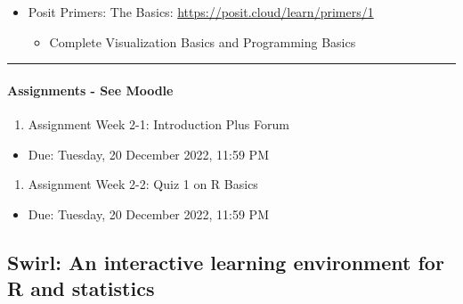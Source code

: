 \documentclass[
]{article}
\providecommand{\tightlist}{%
  \setlength{\itemsep}{0pt}\setlength{\parskip}{0pt}}
\begin{document}
\begin{itemize}
\tightlist
\item
  Posit Primers: The Basics: \url{https://posit.cloud/learn/primers/1}

  \begin{itemize}
  \tightlist
  \item
    Complete Visualization Basics and Programming Basics
  \end{itemize}
\end{itemize}

\begin{center}\rule{0.5\linewidth}{0.5pt}\end{center}

\hypertarget{assignments---see-moodle}{%
\paragraph{Assignments - See Moodle}\label{assignments---see-moodle}}

\begin{enumerate}
\def\labelenumi{\arabic{enumi}.}
\tightlist
\item
  Assignment Week 2-1: Introduction Plus Forum\\
\end{enumerate}

\begin{itemize}
\tightlist
\item
  Due: Tuesday, 20 December 2022, 11:59 PM
\end{itemize}

\begin{enumerate}
\def\labelenumi{\arabic{enumi}.}
\setcounter{enumi}{1}
\tightlist
\item
  Assignment Week 2-2: Quiz 1 on R Basics
\end{enumerate}

\begin{itemize}
\tightlist
\item
  Due: Tuesday, 20 December 2022, 11:59 PM
\end{itemize}

\hypertarget{swirl-an-interactive-learning-environment-for-r-and-statistics}{%
\subsection{Swirl: An interactive learning environment for R and
statistics}\label{swirl-an-interactive-learning-environment-for-r-and-statistics}}
\end{document}
